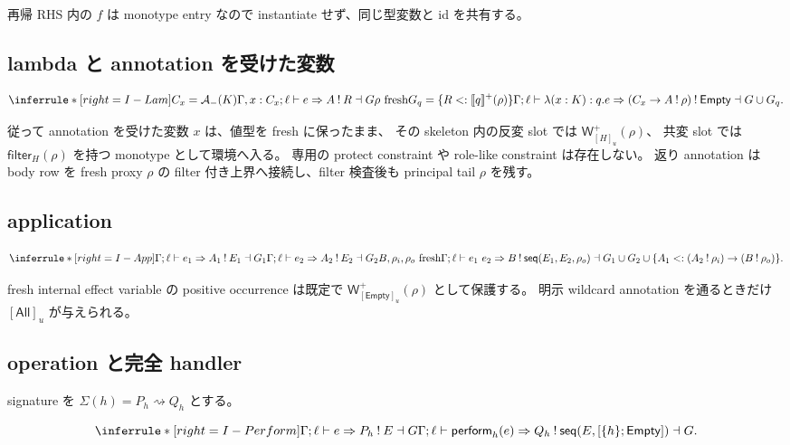 \documentclass[uplatex,dvipdfmx,a4paper,10.5pt]{jsarticle}
\theoremstyle{jpplain}
\newcommand{\All}{\mathsf{All}}
\newcommand{\Empty}{\mathsf{Empty}}
\newcommand{\seq}{\mathsf{seq}}
\newcommand{\Filter}[2]{\mathsf{filter}_{#1}(#2)}
\newcommand{\PWeight}[2]{\mathsf{W}^{+}_{#1}(#2)}
\newcommand{\takeop}[2]{[#1]_{#2}}
\newcommand{\row}[2]{[#1;#2]}
\newcommand{\comp}{\mathbin{!}}
\newcommand{\subty}[2]{#1\mathrel{<:}#2}
\newcommand{\kw}[1]{\mathsf{#1}}
\newcommand{\sem}[1]{[\![#1]\!]}
\begin{document}
再帰 RHS 内の $f$ は monotype entry なので instantiate せず、同じ型変数と id を共有する。

\subsection{lambda と annotation を受けた変数}

\[
\inferrule*[right=I-Lam]
 {C_x=\mathcal A_-(K)\\
  \Gamma,x:C_x;\ell\vdash e\Rightarrow A\comp R\dashv G\\
  \rho\ \text{fresh}\\
  G_q=\{\subty{R}{\sem{q}^+(\rho)}\}}
 {\Gamma;\ell\vdash\lambda(x:K):q.e
   \Rightarrow (C_x\to A\comp\rho)\comp\Empty
   \dashv G\cup G_q}.
\]

従って annotation を受けた変数 $x$ は、値型を fresh に保ったまま、
その skeleton 内の反変 slot では $\PWeight{\takeop{H}{u}}{\rho}$、
共変 slot では $\Filter{H}{\rho}$ を持つ monotype として環境へ入る。
専用の protect constraint や role-like constraint は存在しない。
返り annotation は body row を fresh proxy $\rho$ の filter 付き上界へ接続し、filter 検査後も principal tail $\rho$ を残す。

\subsection{application}

\[
\inferrule*[right=I-App]
 {\Gamma;\ell\vdash e_1\Rightarrow A_1\comp E_1\dashv G_1\\
  \Gamma;\ell\vdash e_2\Rightarrow A_2\comp E_2\dashv G_2\\
  B,\rho_i,\rho_o\ \text{fresh}}
 {\Gamma;\ell\vdash e_1\ e_2\Rightarrow
  B\comp\seq(E_1,E_2,\rho_o)\dashv
  G_1\cup G_2\cup
  \{\subty{A_1}{(A_2\comp\rho_i)\to(B\comp\rho_o)}\}}.
\]

fresh internal effect variable の positive occurrence は既定で
$\PWeight{\takeop{\Empty}{u}}{\rho}$ として保護する。
明示 wildcard annotation を通るときだけ $\takeop{\All}{u}$ が与えられる。

\subsection{operation と完全 handler}

signature を $\Sigma(h)=P_h\rightsquigarrow Q_h$ とする。

\[
\inferrule*[right=I-Perform]
 {\Gamma;\ell\vdash e\Rightarrow P_h\comp E\dashv G}
 {\Gamma;\ell\vdash \kw{perform}_h(e)
  \Rightarrow Q_h\comp\seq(E,\row{\{h\}}{\Empty})\dashv G}.
\]
\end{document}
